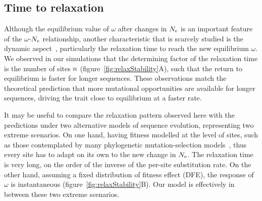 \subsection{Time to relaxation}

Although the equilibrium value of $\omega$ after changes in $N_{\mathrm{e}}$ is an important feature of the $\omega$-$N_{\mathrm{e}}$ relationship, another characteristic that is scarcely studied is the dynamic aspect~\citep{Jones2016}, particularly the relaxation time to reach the new equilibrium $\omega$.
We observed in our simulations that the determining factor of the relaxation time is the number of sites $n$ (figure~\ref{fig:relaxStability}A), such that the return to equilibrium is faster for longer sequences.
These observations match the theoretical prediction that more mutational opportunities are available for longer sequences, driving the trait close to equilibrium at a faster rate.

It may be useful to compare the relaxation pattern observed here with the predictions under two alternative models of sequence evolution, representing two extreme scenarios.
On one hand, having fitness modelled at the level of sites, such as those contemplated by many phylogenetic mutation-selection models~\citep{Halpern1998, Rodrigue2010, Tamuri2012}, thus every site has to adapt on its own to the new change in $N_{\mathrm{e}}$.
The relaxation time is very long, on the order of the inverse of the per-site substitution rate.
On the other hand, assuming a fixed distribution of fitness effect (\acrshort{DFE}), the response of $\omega$ is instantaneous (figure~\ref{fig:relaxStability}B).
Our model is effectively in between these two extreme scenarios.

